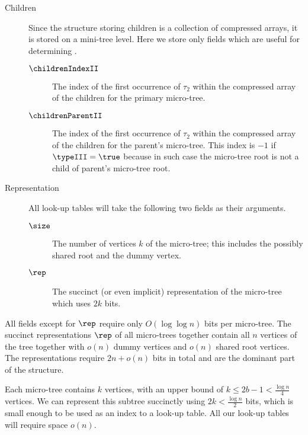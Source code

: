 \begin{description}
	\item[Children]
	Since the structure storing children is a collection of compressed arrays, it is stored on a mini-tree level.
	Here we store only fields which are useful for determining \childRank.
	\begin{description}
		\item[$\childrenIndexII$]
		The index of the first occurrence of $\tau_2$ within the compressed array of the children for the primary micro-tree.
		
		\item[$\childrenParentII$]
		The index of the first occurrence of $\tau_2$ within the compressed array of the children for the parent's micro-tree.
		This index is $-1$ if $\typeIII = \true$ because in such case the micro-tree root is not a child of parent's micro-tree root.
	\end{description}
	
	\item[Representation]
	All look-up tables will take the following two fields as their arguments.
	\begin{description}
		\item[$\size$]
		The number of vertices $k$ of the micro-tree; this includes the possibly shared root and the dummy vertex.
		
		\item[$\rep$]
		The succinct (or even implicit) representation of the micro-tree which uses $2k$ bits.
	\end{description}
\end{description}

All fields except for $\rep$ require only $O(\log \log n)$ bits per micro-tree.
The succinct representations $\rep$ of all micro-trees together contain all $n$ vertices of the tree together with $o(n)$ dummy vertices and $o(n)$ shared root vertices.
The representations require $2n + o(n)$ bits in total and are the dominant part of the structure.

Each micro-tree contains $k$ vertices, with an upper bound of $ k \le 2b - 1 < \frac{\log n}{4}$ vertices.
We can represent this subtree succinctly using $2k < \frac{\log n}{2}$ bits, which is small enough to be used as an index to a look-up table.
All our look-up tables will require space $o(n)$.

\bigbreak

